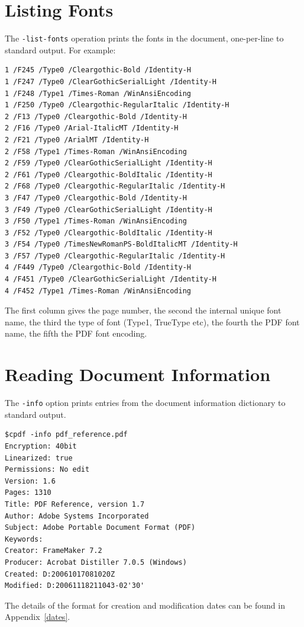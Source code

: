 \documentclass[a4paper,makeidx]{memoir}
\begin{document}
  \section{Listing Fonts}
  The \texttt{-list-fonts} operation prints the fonts in the document,
one-per-line to standard output. For example:
\begin{framed}\small\begin{verbatim}1 /F245 /Type0 /Cleargothic-Bold /Identity-H
1 /F247 /Type0 /ClearGothicSerialLight /Identity-H
1 /F248 /Type1 /Times-Roman /WinAnsiEncoding
1 /F250 /Type0 /Cleargothic-RegularItalic /Identity-H
2 /F13 /Type0 /Cleargothic-Bold /Identity-H
2 /F16 /Type0 /Arial-ItalicMT /Identity-H
2 /F21 /Type0 /ArialMT /Identity-H
2 /F58 /Type1 /Times-Roman /WinAnsiEncoding
2 /F59 /Type0 /ClearGothicSerialLight /Identity-H
2 /F61 /Type0 /Cleargothic-BoldItalic /Identity-H
2 /F68 /Type0 /Cleargothic-RegularItalic /Identity-H
3 /F47 /Type0 /Cleargothic-Bold /Identity-H
3 /F49 /Type0 /ClearGothicSerialLight /Identity-H
3 /F50 /Type1 /Times-Roman /WinAnsiEncoding
3 /F52 /Type0 /Cleargothic-BoldItalic /Identity-H
3 /F54 /Type0 /TimesNewRomanPS-BoldItalicMT /Identity-H
3 /F57 /Type0 /Cleargothic-RegularItalic /Identity-H
4 /F449 /Type0 /Cleargothic-Bold /Identity-H
4 /F451 /Type0 /ClearGothicSerialLight /Identity-H
4 /F452 /Type1 /Times-Roman /WinAnsiEncoding
\end{verbatim}
\end{framed}

\noindent The first column gives the page number, the second the internal unique font
name, the third the type of font (Type1, TrueType etc), the fourth the PDF font
name, the fifth the PDF font encoding.
 
\section{Reading Document Information}
\label{info}
The \texttt{-info} option prints entries from the document information
dictionary to standard output.

\begin{framed}
\begin{verbatim}
$cpdf -info pdf_reference.pdf
Encryption: 40bit
Linearized: true
Permissions: No edit
Version: 1.6
Pages: 1310
Title: PDF Reference, version 1.7
Author: Adobe Systems Incorporated
Subject: Adobe Portable Document Format (PDF)
Keywords: 
Creator: FrameMaker 7.2
Producer: Acrobat Distiller 7.0.5 (Windows)
Created: D:20061017081020Z
Modified: D:20061118211043-02'30'
\end{verbatim}
\end{framed}
\noindent The details of the format for creation and modification dates can be found in
Appendix~\ref{dates}.
\end{document}
